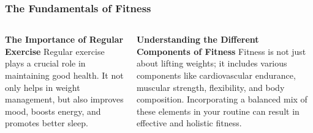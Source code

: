 \documentclass[5pt]{beamer}
\begin{document}
\begin{frame}
\frametitle{The Fundamentals of Fitness}
\begin{columns}
\begin{column}{0.45\textwidth}
\begin{block}{\textbf{The Importance of Regular Exercise}}
Regular exercise plays a crucial role in maintaining good health. It not only helps in weight management, but also improves mood, boosts energy, and promotes better sleep.
\end{block}
\end{column}
\begin{column}{0.45\textwidth}
\begin{block}{\textbf{Understanding the Different Components of Fitness}}
Fitness is not just about lifting weights; it includes various components like cardiovascular endurance, muscular strength, flexibility, and body composition. Incorporating a balanced mix of these elements in your routine can result in effective and holistic fitness.
\end{block}
\end{column}
\end{columns}
\end{frame}
\end{document}
